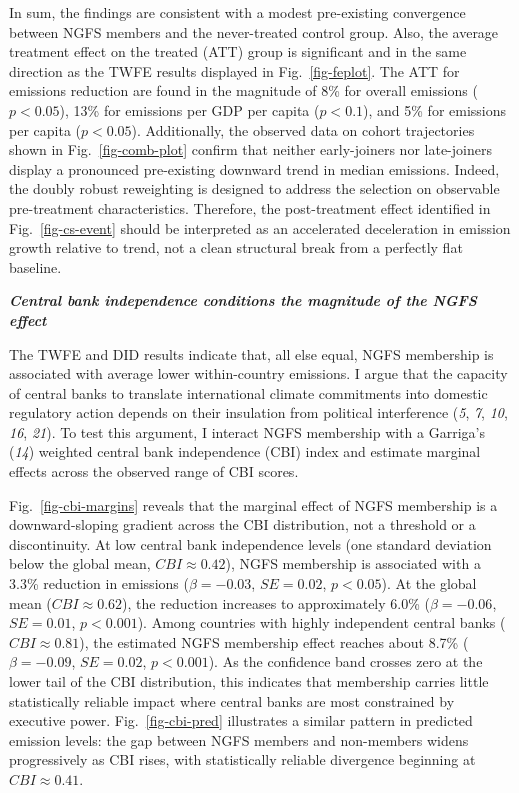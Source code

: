 \documentclass[
  12pt,
  letterpaper,
]{article}
\begin{document}
In sum, the findings are consistent with a modest pre-existing
convergence between NGFS members and the never-treated control group.
Also, the average treatment effect on the treated (ATT) group is
significant and in the same direction as the TWFE results displayed in
Fig.~\ref{fig-feplot}. The ATT for emissions reduction are found in the
magnitude of 8\% for overall emissions (\(p < 0.05\)), 13\% for
emissions per GDP per capita (\(p < 0.1\)), and 5\% for emissions per
capita (\(p < 0.05\)). Additionally, the observed data on cohort
trajectories shown in Fig.~\ref{fig-comb-plot} confirm that neither
early-joiners nor late-joiners display a pronounced pre-existing
downward trend in median emissions. Indeed, the doubly robust
reweighting is designed to address the selection on observable
pre-treatment characteristics. Therefore, the post-treatment effect
identified in Fig.~\ref{fig-cs-event} should be interpreted as an
accelerated deceleration in emission growth relative to trend, not a
clean structural break from a perfectly flat baseline.

\textbf{\emph{Central bank independence conditions the magnitude of the
NGFS effect}}

The TWFE and DID results indicate that, all else equal, NGFS membership
is associated with average lower within-country emissions. I argue that
the capacity of central banks to translate international climate
commitments into domestic regulatory action depends on their insulation
from political interference (\emph{5}, \emph{7}, \emph{10}, \emph{16},
\emph{21}). To test this argument, I interact NGFS membership with a
Garriga's (\emph{14}) weighted central bank independence (CBI) index and
estimate marginal effects across the observed range of CBI scores.

Fig.~\ref{fig-cbi-margins} reveals that the marginal effect of NGFS
membership is a downward-sloping gradient across the CBI distribution,
not a threshold or a discontinuity. At low central bank independence
levels (one standard deviation below the global mean,
\(CBI \approx 0.42\)), NGFS membership is associated with a 3.3\%
reduction in emissions (\(\beta = -0.03\), \(SE = 0.02\), \(p < 0.05\)).
At the global mean (\(CBI \approx 0.62\)), the reduction increases to
approximately 6.0\% (\(\beta = -0.06\), \(SE = 0.01\), \(p < 0.001\)).
Among countries with highly independent central banks
(\(CBI \approx 0.81\)), the estimated NGFS membership effect reaches
about 8.7\% (\(\beta = -0.09\), \(SE = 0.02\), \(p < 0.001\)). As the
confidence band crosses zero at the lower tail of the CBI distribution,
this indicates that membership carries little statistically reliable
impact where central banks are most constrained by executive power.
Fig.~\ref{fig-cbi-pred} illustrates a similar pattern in predicted
emission levels: the gap between NGFS members and non-members widens
progressively as CBI rises, with statistically reliable divergence
beginning at \(CBI \approx 0.41\).
\end{document}
